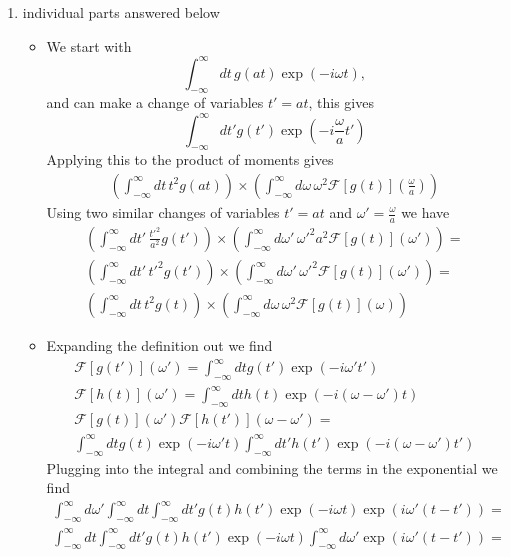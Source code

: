 \documentclass[english]{article}
\begin{document}
\begin{enumerate}
\begin{itemize}
\end{itemize}
\item individual parts answered below
\begin{itemize}
\item We start with 
\begin{equation}
\int_{-\infty}^\infty dt\, g(a t)\exp(-i\omega t),
\end{equation}
 and can make a change of variables $t'= a t$, this gives 
 \begin{equation}
 \int_{-\infty}^\infty dt' g(t')\exp(-i\frac{\omega}{a} t')
 \end{equation}
 Applying this to the product of moments gives
 \begin{align}
(\int_{-\infty}^{\infty}dt\, t^2 g(a t))\times (\int_{-\infty}^{\infty}d\omega\,\omega^2 \mathcal{F}[g(t)](\frac{\omega}{a}) )
\end{align}
Using two similar changes of variables $t'=a t$ and $\omega'=\frac{\omega}{a}$ we have
 \begin{align}
(\int_{-\infty}^{\infty}dt'\, \frac{t'^2}{a^2} g(t'))\times (\int_{-\infty}^{\infty}d\omega'\,\omega'^2a^2 \mathcal{F}[g(t)](\omega') )=\\
(\int_{-\infty}^{\infty}dt'\, t'^2 g(t'))\times (\int_{-\infty}^{\infty}d\omega'\,\omega'^2\mathcal{F}[g(t)](\omega') )=\\
(\int_{-\infty}^{\infty}dt\, t^2 g(t))\times (\int_{-\infty}^{\infty}d\omega\,\omega^2\mathcal{F}[g(t)](\omega) )
\end{align}
\item Expanding the definition out we find
\begin{align}
 \mathcal{F}[g(t')](\omega')=\int_{-\infty}^\infty dt g(t')\exp(-i\omega' t') \\
 \mathcal{F}[h(t)](\omega')=\int_{-\infty}^\infty dt h(t)\exp(-i(\omega -\omega') t)  \\
 \mathcal{F}[g(t)](\omega')\mathcal{F}[h(t')](\omega-\omega')=\nonumber \\
 \int_{-\infty}^\infty dt g(t)\exp(-i\omega' t) \int_{-\infty}^\infty dt' h(t')\exp(-i(\omega -\omega') t')
 \end{align}
 Plugging into the integral and combining the terms in the exponential we find
 \begin{align}
 \int_{-\infty}^\infty d\omega' \int_{-\infty}^\infty dt \int_{-\infty}^\infty dt'  g(t) h(t')\exp(-i\omega t) \exp(i\omega'(t-t'))=\\
 \int_{-\infty}^\infty dt \int_{-\infty}^\infty dt'  g(t) h(t')\exp(-i\omega t) \int_{-\infty}^\infty d\omega'  \exp(i\omega'(t-t'))=\\

\end{align}
\end{itemize}
\end{enumerate}
\end{document}
